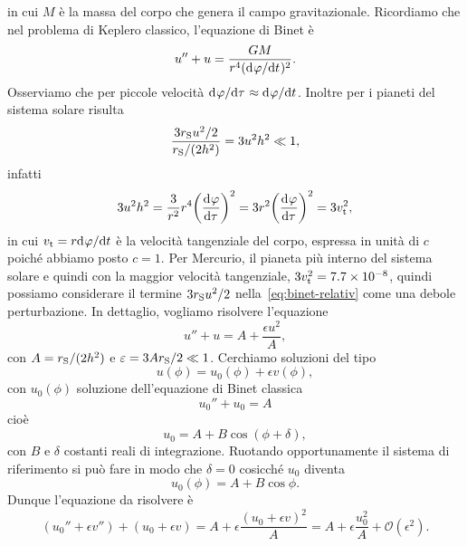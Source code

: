 in cui $M$ è la massa del corpo che genera il campo gravitazionale.  Ricordiamo
che nel problema di Keplero classico, l'equazione di
Binet è
\begin{equation}
  \label{eq:binet}
  u'' + u = \frac{GM}{r^{4}(\ltoder{\phi}{t})^{2}}.
\end{equation}
Osserviamo che per piccole velocità
$\ltoder{\phi}{\tau} \approx \ltoder{\phi}{t}$.  Inoltre per i pianeti del
sistema solare risulta
\begin{equation}
  \frac{3r_{\textup{S}}u^{2}/2}{r_{\textup{S}}/(2h^{2})} = 3u^{2}h^{2} \ll 1,
\end{equation}
infatti
\begin{equation}
  3u^{2}h^{2} = \frac{3}{r^{2}}r^{4} \bigg(\toder{\phi}{\tau}\bigg)^{2} = 3r^{2}
  \bigg(\toder{\phi}{\tau}\bigg)^{2} = 3 v_{\textup{t}}^{2},
\end{equation}
in cui $v_{\textup{t}} = r\ltoder{\phi}{t}$ è la velocità tangenziale del corpo,
espressa in unità di $c$ poiché abbiamo posto $c = 1$.  Per Mercurio, il pianeta
più interno del sistema solare e quindi con la maggior velocità tangenziale,
$3 v_{\textup{t}}^{2} = \num{7.7e-8}$, quindi possiamo considerare il termine
$3r_{\textup{S}}u^{2}/2$ nella~\eqref{eq:binet-relativ} come una debole
perturbazione.  In dettaglio, vogliamo risolvere l'equazione
\begin{equation}
  u'' + u = A + \frac{\epsilon u^{2}}{A},
\end{equation}
con $A = r_{\textup{S}}/(2h^{2})$ e $\epsilon = 3Ar_{\textup{S}}/2  \ll 1$.
Cerchiamo soluzioni del tipo
\begin{equation}
  u(\phi) = u_{0}(\phi) + \epsilon v(\phi),
\end{equation}
con $u_{0}(\phi)$ soluzione dell'equazione di Binet classica
\begin{equation}
  \label{eq:binet-2}
  u_{0}'' + u_{0} = A
\end{equation}
cioè
\begin{equation}
  u_{0} = A + B\cos(\phi + \delta),
\end{equation}
con $B$ e $\delta$ costanti reali di integrazione.  Ruotando opportunamente il
sistema di riferimento si può fare in modo che $\delta = 0$ cosicché $u_{0}$
diventa
\begin{equation}
  \label{eq:sol-binet}
  u_{0}(\phi) = A + B\cos\phi.
\end{equation}
Dunque l'equazione da risolvere è
\begin{equation}
  (u_{0}'' + \epsilon v'') + (u_{0} + \epsilon v) = A + \epsilon \frac{(u_{0} +
    \epsilon v)^{2}}{A} = A + \epsilon \frac{u_{0}^{2}}{A} +
  \mathcal{O}(\epsilon^{2}).
\end{equation}
